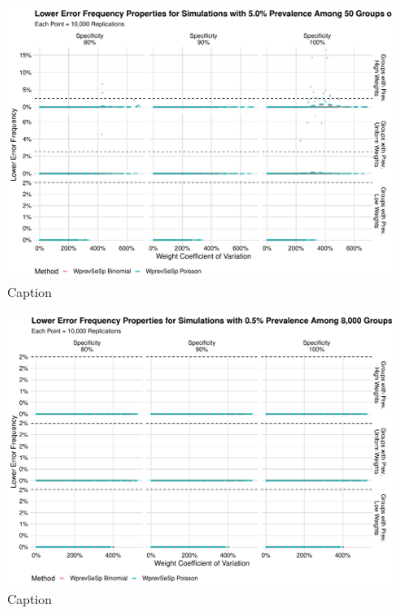 \documentclass[AMA,STIX1COL]{WileyNJD-v2}
\begin{document}
\begin{figure}
    \centering
    \includegraphics[width=\textwidth]{figures/imperfect_lower_error_frequency_50_0_05_reduced.pdf}
    \caption{Caption}
    \label{fig:imperfect_lower_error_frequency_50_0_05_reduced}
\end{figure}


\begin{figure}
    \centering
    \includegraphics[width=\textwidth]{figures/imperfect_lower_error_frequency_8000_0_005_reduced.pdf}
    \caption{Caption}
    \label{fig:imperfect_lower_error_frequency_8000_0_005_reduced}
\end{figure}
\end{document}
